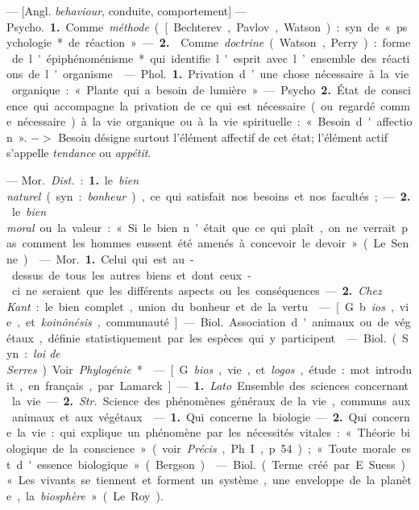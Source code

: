 \begin{itemize}[leftmargin=1cm, label=, itemsep=1pt]
 — [Angl. {\it behaviour}, conduite, comportement] — \si{Psycho.}
{\bf 1.} Comme {\it méthode} ([Bechterev,
Pavlov, Watson) : syn. de « psychologie* de réaction ». — {\bf 2.}  Comme
{\it doctrine} (Watson, Perry) : forme de
l'épiphénoménisme* qui identifie
l'esprit avec l’ensemble des réactions
de l'organisme.

 — \si{Phol.} {\bf 1.} Privation d’une
chose nécessaire à la vie organique :
« Plante qui a besoin de lumière ».

— \si{Psycho} {\bf 2.} État de conscience
qui accompagne la privation de ce
qui est nécessaire (ou regardé comme
nécessaire) à la vie organique ou à la
vie spirituelle : « Besoin d'affection ».
$->$ Besoin désigne surtout l'élément
affectif de cet état; l’élément actif
s'appelle {\it tendance} ou {\it appétit}.

 — \si{Mor.} {\it Dist.} : {\bf 1.} le {\it bien naturel}
(syn. : {\it bonheur}), ce qui satisfait nos
besoins et nos facultés; — {\bf 2.} le {\it bien
moral} ou la valeur : « Si le bien
n'était que ce qui plaît, on ne verrait pas comment les hommes eussent
été amenés à concevoir le devoir »
(Le Senne).

 — \si{Mor.} {\bf 1.} Celui
qui est au-dessus de tous les autres
biens et dont ceux-ci ne seraient que
les différents aspects ou les conséquences. — {\bf 2.} {\it Chez Kant} : le bien
complet, union du bonheur et de la
vertu.

 — [G. b{\it ios}, vie, et {\it koinônésis},
communauté] — \si{Biol.} Association
d'animaux ou de végétaux, définie
statistiquement par les espèces qui y
participent.

 — \si{Biol.} (Syn. :
{\it loi de Serres}). Voir {\it Phylogénie}*.

 — [G. {\it bios}, vie, et {\it logos}, étude :
mot introduit, en français, par
Lamarck] — {\bf 1.} {\it Lato}. Ensemble des
sciences concernant la vie. — {\bf 2.} {\it Str.}
Science des phénomènes généraux
de la vie, communs aux animaux et
aux végétaux.

 — {\bf 1.} Qui concerne la
biologie. — {\bf 2.} Qui concerne la vie:
qui explique un phénomène par les
nécessités vitales : « Théorie biologique
de la conscience » (voir {\it Précis},
Ph. I, p. 54); « Toute morale est
d'essence biologique » (Bergson).

 — \si{Biol.} (Terme créé par
E. Suess). « Les vivants se tiennent
et forment un système, une enveloppe de la planète, la {\it biosphère} »
(Le Roy).


\end{itemize}
